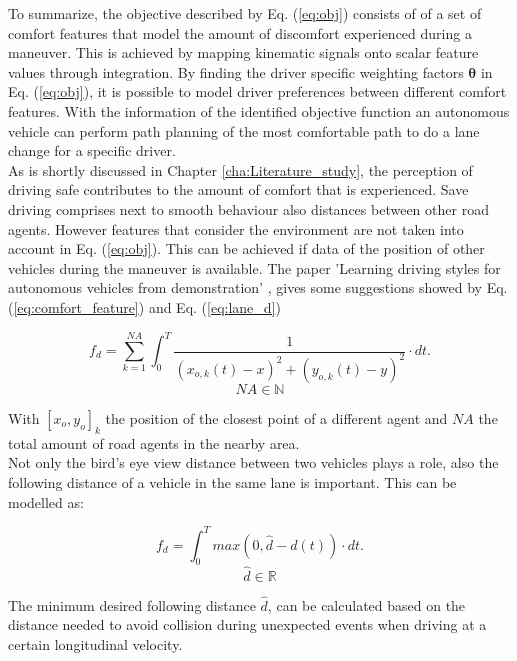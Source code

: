 To summarize, the objective described by Eq. (\ref{eq:obj}) consists of of a set of comfort features that model the amount of discomfort experienced during a maneuver. This is achieved by mapping kinematic signals onto scalar feature values through integration. By finding the driver specific weighting factors $\bm{\theta}$ in Eq. (\ref{eq:obj}), it is possible to model driver preferences between different comfort features. With the information of the identified objective function an autonomous vehicle can perform path planning of the most comfortable path to do a lane change for a specific driver.\\

As is shortly discussed in Chapter \ref{cha:Literature_study}, the perception of driving safe contributes to the amount of comfort that is experienced. Save driving comprises next to smooth behaviour also distances between other road agents. However features that consider the environment are not taken into account in Eq. (\ref{eq:obj}). This can be achieved if data of the position of other vehicles during the maneuver is available. The paper 'Learning driving styles for autonomous vehicles from demonstration' \cite{Kuderer2015a}, gives some suggestions showed by Eq. (\ref{eq:comfort_feature}) and  Eq. (\ref{eq:lane_d})  
\newpage

\begin{equation}\label{eq:comfort_feature}
f_d= \sum_{k = 1}^{NA}\int_{0}^{T}\frac{1}{(x_{o,k}(t)-x)^2+(y_{o,k}(t)-y)^2}\cdot dt.
\end{equation}
\[NA \in \mathbb{N}\]

With $[x_o,y_o]_k$ the position of the closest point of a different agent and $NA$ the total amount of road agents in the nearby area.\\

Not only the bird's eye view distance between two vehicles plays a role, also the following distance of a vehicle in the same lane is important. This can be modelled as:  

\begin{equation}\label{eq:lane_d}
f_d= \int_{0}^{T} max(0,\hat{d}-d(t))\cdot dt.
\end{equation}
\[\hat{d} \in \mathbb{R}\]


The minimum desired following distance $\hat{d}$, can be calculated based on the  distance needed to avoid collision during unexpected events when driving at a certain longitudinal velocity. \\

